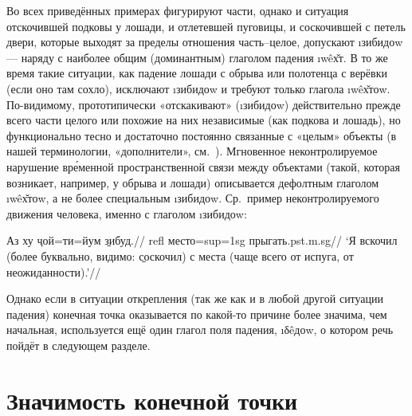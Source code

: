 Во всех приведённых примерах фигурируют части, однако и ситуация отскочившей подковы у лошади, и отлетевшей пуговицы, и соскочившей с петель двери, которые выходят за пределы отношения часть–целое, допускают \i{зибидоw} — наряду с наиболее общим (доминантным) глаголом падения \i{wêх̌т}. В то же время такие ситуации, как падение лошади с обрыва или полотенца с верёвки (если оно там сохло), исключают \i{зибидоw} и требуют только глагола \i{wêх̌тоw}. По-видимому, прототипически «отскакивают» (\i{зибидоw}) действительно прежде всего части целого или похожие на них независимые (как подкова и лошадь), но функционально тесно и достаточно постоянно связанные с «целым» объекты (в нашей терминологии, «дополнители», см.~\parencite{rakhilina2000}). Мгновенное неконтролируемое нарушение вре́менной пространственной связи между объектами (такой, которая возникает, например, у обрыва и лошади) описывается дефолтным глаголом \i{wêх̌тоw}, а не более специальным \i{зибидоw}. Ср.~пример неконтролируемого движения человека, именно с глаголом \i{зибидоw}:

\begingl
\gla Аз ху ҷой=ти=йум \b{зибуд}.//
 {\sc refl} место={\sc sup=1sg} прыгать.{\sc pst.m.sg}//
\glft ‘Я вскочил (более буквально, видимо: \b{соскочил}) с места (чаще всего от испуга, от неожиданности).’//
\endgl \xe

Однако если в ситуации открепления (так же как и в любой другой ситуации падения) конечная точка оказывается по какой-то причине более значима, чем начальная, используется ещё один глагол поля падения, \i{δêдоw}, о котором речь пойдёт в следующем разделе.

\section{Значимость конечной точки} \label{down-endpoint}

